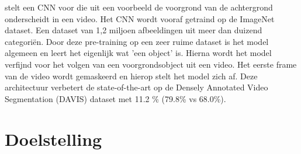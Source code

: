 \npar \cite{oneshot-video-segm} stelt een CNN voor die uit een voorbeeld de voorgrond van de achtergrond onderscheidt in een video. Het CNN wordt vooraf getraind op de ImageNet dataset. Een dataset van 1,2 miljoen afbeeldingen uit meer dan duizend categori\"en. Door deze pre-training op een zeer ruime dataset is het model algemeen en leert het eigenlijk wat 'een object' is. Hierna wordt het model verfijnd voor het volgen van een voorgrondsobject uit een video. Het eerste frame van de video wordt gemaskeerd en hierop stelt het model zich af. Deze architectuur verbetert de state-of-the-art op de Densely Annotated Video Segmentation (DAVIS) dataset met 11.2 \% (79.8\% vs 68.0\%).

\section{Doelstelling}









 